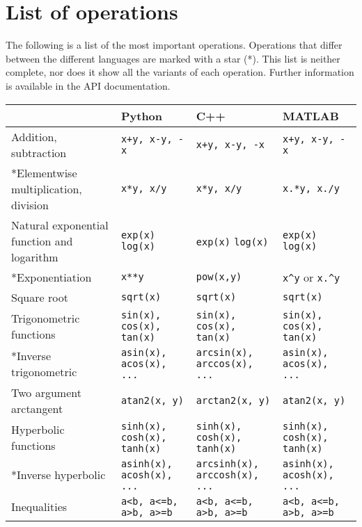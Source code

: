 \documentclass[a4paper,12pt]{book}
\begin{document}
\section{List of operations}
The following is a list of the most important operations. Operations that differ between the different
languages are marked with a star (*). This list is neither complete, nor does it show all the variants of
each operation. Further information is available in the API documentation.

\begin{center}
  \scriptsize
  \begin{tabular}{| p{3.5cm} | p{3.5cm} | p{3.5cm} | p{3.5cm} | }
    \hline
      & Python & C++ & MATLAB \\ \hline
    Addition, subtraction
    & \verb|x+y, x-y, -x| & \verb|x+y, x-y, -x| & \verb|x+y, x-y, -x| \\ \hline
    *Elementwise multiplication, division
    & \verb|x*y, x/y| & \verb|x*y, x/y| & \verb|x.*y, x./y| \\ \hline
    Natural exponential function and logarithm
    & \verb|exp(x)| \linebreak \verb|log(x)|
    & \verb|exp(x)| \linebreak \verb|log(x)|
    & \verb|exp(x)| \linebreak \verb|log(x)| \\ \hline
    *Exponentiation & \verb|x**y|
    & \verb|pow(x,y)| & \verb|x^y| or \verb|x.^y| \\ \hline
    Square root & \verb|sqrt(x)|
    & \verb|sqrt(x)| & \verb|sqrt(x)| \\ \hline
    Trigonometric functions & \verb|sin(x), cos(x), tan(x)| & \verb|sin(x), cos(x), tan(x)| & \verb|sin(x), cos(x), tan(x)| \\ \hline
    *Inverse trigonometric & \verb|asin(x), acos(x), ...| & \verb|arcsin(x), arccos(x), ...| & \verb|asin(x), acos(x), ...| \\ \hline
    Two argument arctangent & \verb|atan2(x, y)| & \verb|arctan2(x, y)| & \verb|atan2(x, y)| \\ \hline
    Hyperbolic functions & \verb|sinh(x), cosh(x), tanh(x)| & \verb|sinh(x), cosh(x), tanh(x)| & \verb|sinh(x), cosh(x), tanh(x)| \\ \hline
    *Inverse hyperbolic & \verb|asinh(x), acosh(x), ...| & \verb|arcsinh(x), arccosh(x), ...| & \verb|asinh(x), acosh(x), ...| \\ \hline
    Inequalities & \verb|a<b, a<=b, a>b, a>=b| & \verb|a<b, a<=b, a>b, a>=b| & \verb|a<b, a<=b, a>b, a>=b| \\ \hline

\end{tabular}
\end{center}
\end{document}
